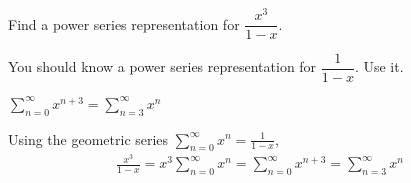 \begin{Mquestion}[2014A]
Find a power series representation for $\dfrac{x^3}{1-x}$.
\end{Mquestion}

\begin{hint}
You should know a power series representation for $\dfrac{1}{1-x}$.
Use it.
\end{hint}

\begin{answer}
$\displaystyle\sum\limits_{n=0}^\infty x^{n+3}
=\sum\limits_{n=3}^\infty x^{n}$
\end{answer}

\begin{solution}
Using the geometric series $\sum\limits_{n=0}^\infty x^n = \frac{1}{1-x}$,
\begin{align*}
\frac{x^3}{1-x}
=x^3 \sum_{n=0}^\infty x^n
=\sum_{n=0}^\infty x^{n+3}
=\sum_{n=3}^\infty x^{n}
\end{align*}
\end{solution}



